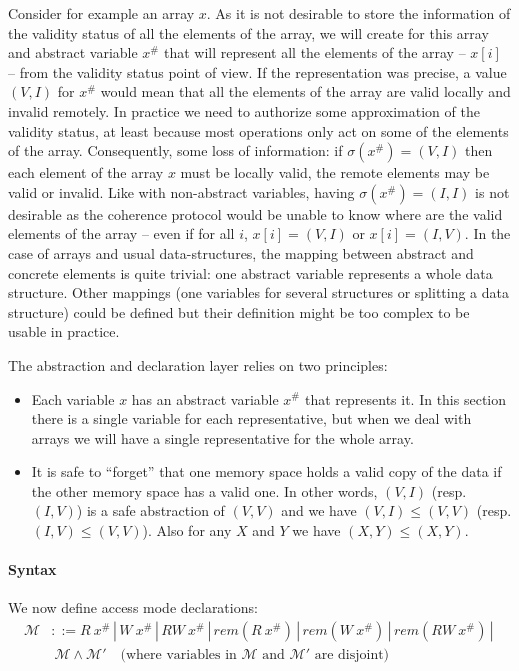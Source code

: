 \documentclass[preprint,12pt]{elsarticle}
\newcommand{\symb}[1]{\textit{#1}}
\newcommand{\rem}[1]{\symb{rem}(#1)}
\newcommand{\abs}[1]{#1^\#}
\newcommand{\AM}{\mathcal{M}}
\begin{document}
Consider for example an array $x$. As it is not desirable to store the information of the validity status of all the elements of the array, we will create for this array and abstract variable $\abs x$ that will represent all the elements of the array -- $x[i]$ -- from the validity status point of view. If the representation was precise, a value $(V,I)$ for $\abs x$ would mean that all the elements of the array are valid locally and invalid remotely. In practice we need to authorize some approximation of the validity status, at least because most operations only act on some of the elements of the array. Consequently, some loss of information: if $\sigma(\abs x)=(V,I)$ then each element of the array $x$ must be locally valid, the remote elements may be valid or invalid. Like with non-abstract variables, having $\sigma(\abs x)=(I,I)$ is  not desirable as the coherence protocol would be unable to know where are the valid elements of the array -- even if for all $i$, $x[i]=(V,I)$ or $x[i]=(I,V)$. In the case of arrays and  usual data-structures, the mapping between abstract and concrete elements is quite trivial: one abstract variable represents a whole data structure. Other mappings (one variables for several structures or splitting a data structure) could be defined but their  definition might be too complex to be usable in practice.


The abstraction and declaration layer relies on two principles:
\begin{itemize}
\item Each variable $x$ has an abstract variable $\abs x$ that represents it. In this 
section there is 
a single variable for each representative, but when we deal with arrays we will 
have a single representative for the whole array.
\item It is safe to ``forget'' that one memory space holds a valid copy of the data if 
the other memory space has a valid one. In other words, $(V,I)$ (resp. $(I,V)$) is a safe 
abstraction of $(V,V)$ and we have $(V,I)\!\leq\! (V,V)$ (resp. $(I,V)\!\leq\! (V,V)$). Also for any $X$ and $Y$ we have $(X,Y)\!\leq\! (X,Y)$.
\end{itemize}

\paragraph{Syntax}
We now define access mode declarations:\\[-3.3ex]
\begin{align*}
\AM&::=R\ \abs x \,|\, W\ \abs x \,|\, RW\ \abs x \,|\, 
\rem{R\ \abs x} \,|\,\rem{W\ \abs x} \,|\,\rem{RW\ \abs x} \,|\, \\
&~ \AM \land \AM' \quad \text{(where variables in $\AM$ and $\AM'$ are disjoint)}
\end{align*}
\end{document}
